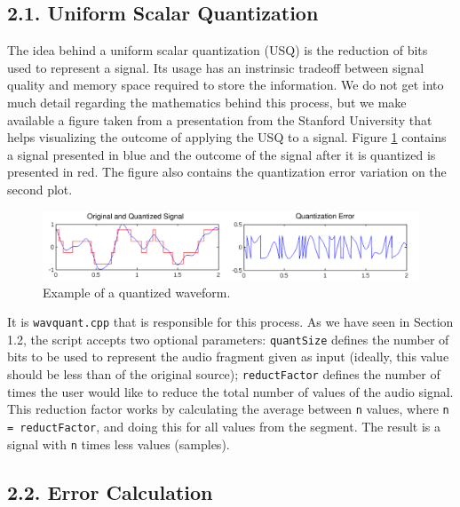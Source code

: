 \documentclass[12pt]{article}
\begin{document}
\subsection*{2.1. Uniform Scalar Quantization}

The idea behind a uniform scalar quantization (USQ) is the reduction of bits 
used to represent a signal.
Its usage has an instrinsic tradeoff between signal quality and memory space
required to store the information.
We do not get into much detail regarding the mathematics behind this process, 
but we make available a figure taken from a presentation from the Stanford 
University \cite{stanford} that helps visualizing the outcome of applying the 
USQ to a signal.
Figure \ref{fig:quantization} contains a signal presented in blue and the outcome
of the signal after it is quantized is presented in red. 
The figure also contains the quantization error variation on
the second plot.

\begin{figure}[H]
  \centering
  \begin{minipage}{\textwidth}
    \centering
    \includegraphics[width=\linewidth]{stanford_quantization_wide.png}
  \end{minipage}%
  \caption{Example of a quantized waveform.}
  \label{fig:quantization}
\end{figure}

It is \texttt{wavquant.cpp} that is responsible for this process.
As we have seen in Section 1.2, the script accepts two optional parameters:
\texttt{quantSize} defines the number of bits to be used to represent the audio 
fragment given as input (ideally, this value should be less than of the original 
source); \texttt{reductFactor} defines the number of times the user would like 
to reduce the total number of values of the audio signal.
This reduction factor works by calculating the average between \texttt{n} values, 
where \texttt{n = reductFactor}, and doing this for all values from the segment.
The result is a signal with \texttt{n} times less values (samples).

\newpage
\subsection*{2.2. Error Calculation}
\end{document}
